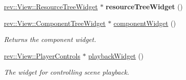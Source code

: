 \begin{Indent}
\begin{DoxyCompactItemize}
\mbox{\hyperlink{classrev_1_1_view_1_1_resource_tree_widget}{rev\+::\+View\+::\+Resource\+Tree\+Widget}} $\ast$ {\bfseries resource\+Tree\+Widget} ()
\item 
\mbox{\label{classrev_1_1_view_1_1_widget_manager_ae8ebc826d025c86dedb97b96813298bb}} 
\mbox{\hyperlink{classrev_1_1_view_1_1_component_tree_widget}{rev\+::\+View\+::\+Component\+Tree\+Widget}} $\ast$ \mbox{\hyperlink{classrev_1_1_view_1_1_widget_manager_ae8ebc826d025c86dedb97b96813298bb}{component\+Widget}} ()
\begin{DoxyCompactList}\small\item\em Returns the component widget. \end{DoxyCompactList}\item 
\mbox{\label{classrev_1_1_view_1_1_widget_manager_a9ce93c1f38b7d4006fa48efdb1130932}} 
\mbox{\hyperlink{classrev_1_1_view_1_1_player_controls}{rev\+::\+View\+::\+Player\+Controls}} $\ast$ \mbox{\hyperlink{classrev_1_1_view_1_1_widget_manager_a9ce93c1f38b7d4006fa48efdb1130932}{playback\+Widget}} ()
\begin{DoxyCompactList}\small\item\em The widget for controlling scene playback. \end{DoxyCompactList}\end{DoxyCompactItemize}
\end{Indent}
